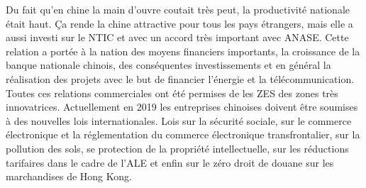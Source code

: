 Du fait qu’en chine la main d’ouvre coutait très peut, la productivité nationale était haut. Ça rende la chine attractive pour tous les pays étrangers, mais elle a aussi investi sur le NTIC et avec un accord très important avec ANASE. Cette relation a portée à la nation des moyens financiers importants, la croissance de la banque nationale chinois, des conséquentes investissements et en général la réalisation des projets avec le but de financier l’énergie et la télécommunication.  
Toutes ces relations commerciales ont été permises de les ZES des zones très innovatrices.
Actuellement en 2019 les entreprises chinoises doivent être soumises à des nouvelles lois internationales. Lois sur la sécurité sociale, sur le commerce électronique et la réglementation du commerce électronique transfrontalier, sur la pollution des sols, se protection de la propriété intellectuelle, sur les réductions tarifaires dans le cadre de l’ALE et enfin sur le zéro droit de douane sur les marchandises de Hong Kong. 

